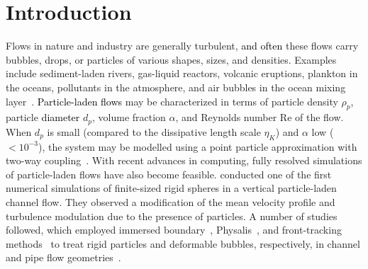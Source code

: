\documentclass{jfm}
\newcommand{\red}[1]{\textcolor{black}{#1}}
\begin{document}
\section{Introduction}\label{sec:introduction}
Flows in nature and industry are generally turbulent, \red{and often} these
flows carry bubbles, drops, or particles of various shapes, sizes, and
densities. Examples include sediment-laden rivers, gas-liquid reactors,
volcanic eruptions, plankton in the oceans, pollutants in the atmosphere, and
air bubbles in the ocean mixing layer~\citep{Toschi2009}.
\red{Particle-laden flows} may be characterized in terms of particle density
$\rho_p$, particle \red{diameter} $d_p$, volume fraction $\alpha$, and
Reynolds number Re of the flow. When $d_p$ is small (compared to the
dissipative length scale $\eta_K$) and $\alpha$ low ($< 10^{-3}$), the system
may be modelled using a point particle approximation with two-way
coupling~\citep{Elghobashi1994,Mazzitelli2003,Mathai2016}.
With recent advances in computing, fully resolved simulations of
particle-laden flows have also become feasible. \cite{Uhlmann2008} conducted
one of the first numerical simulations of finite-sized rigid spheres in a
vertical particle-laden channel flow. They observed a modification of the mean
velocity profile and turbulence modulation due to the presence of particles. A
number of studies followed, which employed immersed
boundary~\citep{Peskin2002,Cisse2013}, Physalis~\citep{Naso2010, Wang2017b},
and front-tracking methods~\citep{Unverdi1992,Roghair2011,Tagawa2013} to treat
rigid particles and deformable bubbles, respectively, in channel and pipe flow
geometries~\citep{Pan1996,Lu2005,Uhlmann2008,Dabiri2013,Kidanemariam2013,Lashgari2014,Picano2015,Costa2016}. 
\end{document}
